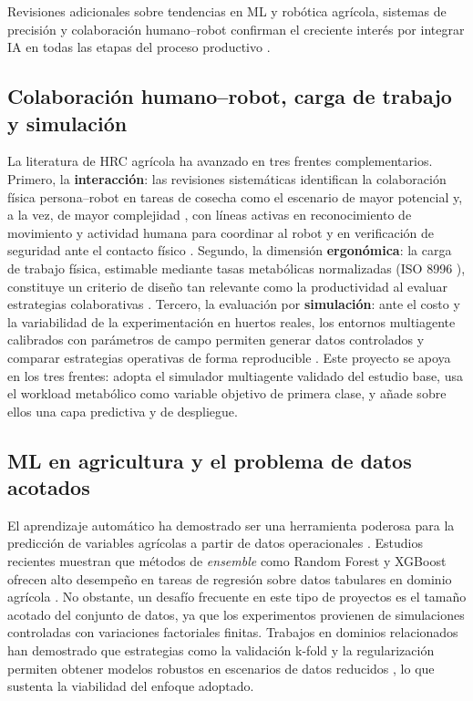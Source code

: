 \documentclass[conference]{IEEEtran}
\begin{document}
Revisiones adicionales sobre tendencias en ML y robótica agrícola, sistemas de precisión y colaboración humano--robot confirman el creciente interés por integrar IA en todas las etapas del proceso productivo \cite{halder2026,taha2025,li2024,thakur2025,mohyuddin2024,icoici2024,logeshwaran2024,tgrs2023}.

\subsection{Colaboración humano--robot, carga de trabajo y simulación}

La literatura de HRC agrícola ha avanzado en tres frentes complementarios. Primero, la \textbf{interacción}: las revisiones sistemáticas identifican la colaboración física persona--robot en tareas de cosecha como el escenario de mayor potencial y, a la vez, de mayor complejidad \cite{benos2023hri,adamides2023}, con líneas activas en reconocimiento de movimiento y actividad humana para coordinar al robot \cite{moysiadis2024,benos2025xai} y en verificación de seguridad ante el contacto físico \cite{guevara2024}. Segundo, la dimensión \textbf{ergonómica}: la carga de trabajo física, estimable mediante tasas metabólicas normalizadas (ISO 8996 \cite{iso8996}), constituye un criterio de diseño tan relevante como la productividad al evaluar estrategias colaborativas \cite{vasconez2022}. Tercero, la evaluación por \textbf{simulación}: ante el costo y la variabilidad de la experimentación en huertos reales, los entornos multiagente calibrados con parámetros de campo permiten generar datos controlados y comparar estrategias operativas de forma reproducible \cite{vasconez2022,garcia2026}. Este proyecto se apoya en los tres frentes: adopta el simulador multiagente validado del estudio base, usa el workload metabólico como variable objetivo de primera clase, y añade sobre ellos una capa predictiva y de despliegue.

\subsection{ML en agricultura y el problema de datos acotados}

El aprendizaje automático ha demostrado ser una herramienta poderosa para la predicción de variables agrícolas a partir de datos operacionales \cite{sharma2023,kuan2025}. Estudios recientes muestran que métodos de \textit{ensemble} como Random Forest y XGBoost ofrecen alto desempeño en tareas de regresión sobre datos tabulares en dominio agrícola \cite{arunkumar2025,sharma2023}. No obstante, un desafío frecuente en este tipo de proyectos es el tamaño acotado del conjunto de datos, ya que los experimentos provienen de simulaciones controladas con variaciones factoriales finitas. Trabajos en dominios relacionados han demostrado que estrategias como la validación k-fold y la regularización permiten obtener modelos robustos en escenarios de datos reducidos \cite{ejss2025}, lo que sustenta la viabilidad del enfoque adoptado.
\end{document}
